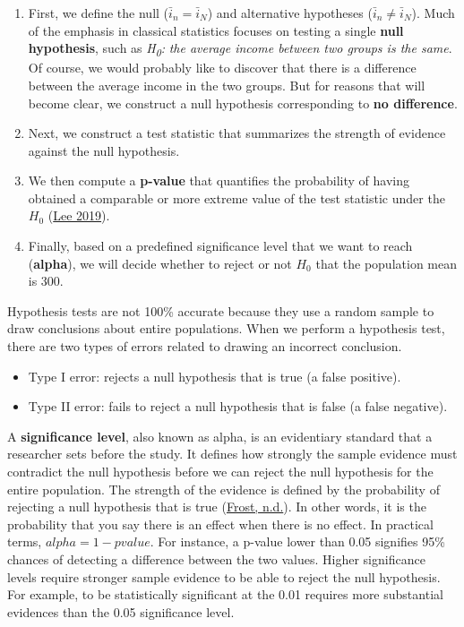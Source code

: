 \documentclass[
]{svmono}
\providecommand{\tightlist}{%
  \setlength{\itemsep}{0pt}\setlength{\parskip}{0pt}}
\begin{document}
\begin{enumerate}
\def\labelenumi{\arabic{enumi}.}
\tightlist
\item
  First, we define the null (\(\bar i_n = \bar i_N\)) and alternative
  hypotheses (\(\bar i_n \neq \bar i_N\)). Much of the emphasis in
  classical statistics focuses on testing a single \textbf{null
  hypothesis}, such as \emph{H\textsubscript{0}:} \emph{the average income between two groups
  is the same}. Of course, we would probably like to discover that
  there is a difference between the average income in the two groups.
  But for reasons that will become clear, we construct a null
  hypothesis corresponding to \textbf{no difference}.
\item
  Next, we construct a test statistic that summarizes the strength of
  evidence against the null hypothesis.
\item
  We then compute a \textbf{p-value} that quantifies the probability of
  having obtained a comparable or more extreme value of the test
  statistic under the \(H_0\) (\protect\hyperlink{ref-lee2019}{Lee 2019}).
\item
  Finally, based on a predefined significance level that we want to
  reach (\textbf{alpha}), we will decide whether to reject or not \(H_0\)
  that the population mean is 300.
\end{enumerate}

Hypothesis tests are not 100\% accurate because they use a random sample
to draw conclusions about entire populations. When we perform a
hypothesis test, there are two types of errors related to drawing an
incorrect conclusion.

\begin{itemize}
\item
  Type I error: rejects a null hypothesis that is true (a false
  positive).
\item
  Type II error: fails to reject a null hypothesis that is false (a
  false negative).
\end{itemize}

A \textbf{significance level}, also known as alpha, is an evidentiary
standard that a researcher sets before the study. It defines how
strongly the sample evidence must contradict the null hypothesis before
we can reject the null hypothesis for the entire population. The
strength of the evidence is defined by the probability of rejecting a
null hypothesis that is true (\protect\hyperlink{ref-frost}{Frost, n.d.}). In other words, it is the
probability that you say there is an effect when there is no effect. In
practical terms, \(alpha=1-pvalue\). For instance, a p-value lower than
0.05 signifies 95\% chances of detecting a difference between the two
values. Higher significance levels require stronger sample evidence to
be able to reject the null hypothesis. For example, to be statistically
significant at the 0.01 requires more substantial evidences than the
0.05 significance level.
\end{document}
